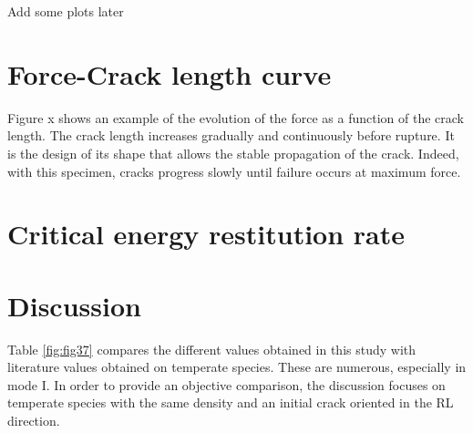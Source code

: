 Add some plots later

\section{Force-Crack length curve}

Figure x shows an example of the evolution of the force as a function of the crack length. The crack length increases gradually and continuously before rupture. It is the design of its shape that allows the stable propagation of the crack. Indeed, with this specimen, cracks progress slowly until failure occurs at maximum force.

\section{Critical energy restitution rate}

\section{Discussion}

Table \ref{fig:fig37} compares the different values obtained in this study with literature values obtained on temperate species. These are numerous, especially in mode I. In order to provide an objective comparison, the discussion focuses on temperate species with the same density and an initial crack oriented in the RL direction.


